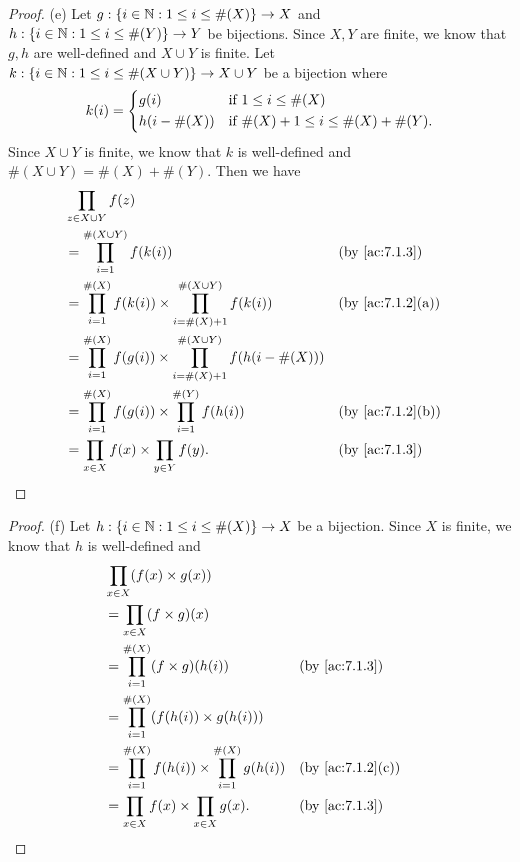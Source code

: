 \begin{proof}{(e)}
  Let \(g : \left\lbrace i \in \mathbb{N} : 1 \leq i \leq \#(X)\right\rbrace \to X\) and \(h : \left\lbrace i \in \mathbb{N} : 1 \leq i \leq \#(Y)\right\rbrace \to Y\) be bijections.
  Since \(X, Y\) are finite, we know that \(g, h\) are well-defined and \(X \cup Y\) is finite.
  Let \(k : \left\lbrace i \in \mathbb{N} : 1 \leq i \leq \#(X \cup Y)\right\rbrace \to X \cup Y\) be a bijection where
  \[
    k(i) = \begin{dcases}
      g(i)         & \text{if } 1 \leq i \leq \#(X)                  \\
      h(i - \#(X)) & \text{if } \#(X) + 1 \leq i \leq \#(X) + \#(Y).
    \end{dcases}
  \]
  Since \(X \cup Y\) is finite, we know that \(k\) is well-defined and \(\#(X \cup Y) = \#(X) + \#(Y)\).
  Then we have
  \begin{align*}
     & \prod_{z \in X \cup Y} f(z)                                                                                       \\
     & = \prod_{i = 1}^{\#(X \cup Y)} f(k(i))                                                      &  & \by{ac:7.1.3}    \\
     & = \prod_{i = 1}^{\#(X)} f(k(i)) \times \prod_{i = \#(X) + 1}^{\#(X \cup Y)} f(k(i))         &  & \by{ac:7.1.2}[a] \\
     & = \prod_{i = 1}^{\#(X)} f(g(i)) \times \prod_{i = \#(X) + 1}^{\#(X \cup Y)} f(h(i - \#(X)))                       \\
     & = \prod_{i = 1}^{\#(X)} f(g(i)) \times \prod_{i = 1}^{\#(Y)} f(h(i))                        &  & \by{ac:7.1.2}[b] \\
     & = \prod_{x \in X} f(x) \times \prod_{y \in Y} f(y).                                         &  & \by{ac:7.1.3}
  \end{align*}
\end{proof}

\begin{proof}{(f)}
  Let \(h : \left\lbrace i \in \mathbb{N} : 1 \leq i \leq \#(X)\right\rbrace \to X\) be a bijection.
  Since \(X\) is finite, we know that \(h\) is well-defined and
  \begin{align*}
     & \prod_{x \in X} (f(x) \times g(x))                                                         \\
     & = \prod_{x \in X} (f \times g)(x)                                                          \\
     & = \prod_{i = 1}^{\#(X)} (f \times g)(h(i))                           &  & \by{ac:7.1.3}    \\
     & = \prod_{i = 1}^{\#(X)} (f(h(i)) \times g(h(i)))                                           \\
     & = \prod_{i = 1}^{\#(X)} f(h(i)) \times \prod_{i = 1}^{\#(X)} g(h(i)) &  & \by{ac:7.1.2}[c] \\
     & = \prod_{x \in X} f(x) \times \prod_{x \in X} g(x).                  &  & \by{ac:7.1.3}
  \end{align*}
\end{proof}


